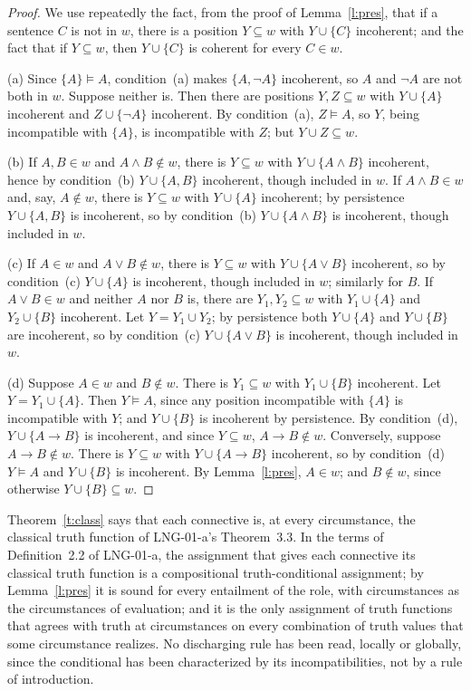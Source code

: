 \documentclass{situationist-preprint}
\begin{document}
\begin{proof}
We use repeatedly the fact, from the proof of Lemma~\ref{l:pres}, that if a sentence $C$ is not in $w$, there is a position $Y \subseteq w$ with $Y \cup \{C\}$ incoherent; and the fact that if $Y \subseteq w$, then $Y \cup \{C\}$ is coherent for every $C \in w$.

(a) Since $\{A\} \models A$, condition~(a) makes $\{A, \neg A\}$ incoherent, so $A$ and $\neg A$ are not both in $w$. Suppose neither is. Then there are positions $Y, Z \subseteq w$ with $Y \cup \{A\}$ incoherent and $Z \cup \{\neg A\}$ incoherent. By condition~(a), $Z \models A$, so $Y$, being incompatible with $\{A\}$, is incompatible with $Z$; but $Y \cup Z \subseteq w$.

(b) If $A, B \in w$ and $A \wedge B \notin w$, there is $Y \subseteq w$ with $Y \cup \{A \wedge B\}$ incoherent, hence by condition~(b) $Y \cup \{A, B\}$ incoherent, though included in $w$. If $A \wedge B \in w$ and, say, $A \notin w$, there is $Y \subseteq w$ with $Y \cup \{A\}$ incoherent; by persistence $Y \cup \{A, B\}$ is incoherent, so by condition~(b) $Y \cup \{A \wedge B\}$ is incoherent, though included in $w$.

(c) If $A \in w$ and $A \vee B \notin w$, there is $Y \subseteq w$ with $Y \cup \{A \vee B\}$ incoherent, so by condition~(c) $Y \cup \{A\}$ is incoherent, though included in $w$; similarly for $B$. If $A \vee B \in w$ and neither $A$ nor $B$ is, there are $Y_1, Y_2 \subseteq w$ with $Y_1 \cup \{A\}$ and $Y_2 \cup \{B\}$ incoherent. Let $Y = Y_1 \cup Y_2$; by persistence both $Y \cup \{A\}$ and $Y \cup \{B\}$ are incoherent, so by condition~(c) $Y \cup \{A \vee B\}$ is incoherent, though included in $w$.

(d) Suppose $A \in w$ and $B \notin w$. There is $Y_1 \subseteq w$ with $Y_1 \cup \{B\}$ incoherent. Let $Y = Y_1 \cup \{A\}$. Then $Y \models A$, since any position incompatible with $\{A\}$ is incompatible with $Y$; and $Y \cup \{B\}$ is incoherent by persistence. By condition~(d), $Y \cup \{A \to B\}$ is incoherent, and since $Y \subseteq w$, $A \to B \notin w$. Conversely, suppose $A \to B \notin w$. There is $Y \subseteq w$ with $Y \cup \{A \to B\}$ incoherent, so by condition~(d) $Y \models A$ and $Y \cup \{B\}$ is incoherent. By Lemma~\ref{l:pres}, $A \in w$; and $B \notin w$, since otherwise $Y \cup \{B\} \subseteq w$.
\end{proof}

Theorem~\ref{t:class} says that each connective is, at every circumstance, the classical truth function of LNG-01-a's Theorem~3.3. In the terms of Definition~2.2 of LNG-01-a, the assignment that gives each connective its classical truth function is a compositional truth-conditional assignment; by Lemma~\ref{l:pres} it is sound for every entailment of the role, with circumstances as the circumstances of evaluation; and it is the only assignment of truth functions that agrees with truth at circumstances on every combination of truth values that some circumstance realizes. No discharging rule has been read, locally or globally, since the conditional has been characterized by its incompatibilities, not by a rule of introduction.
\end{document}
